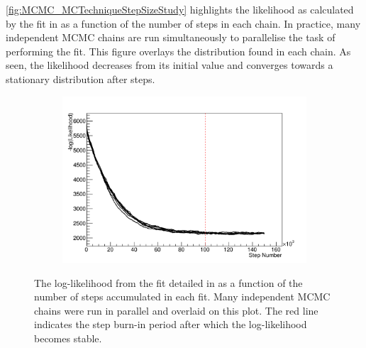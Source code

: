 \autoref{fig:MCMC_MCTechniqueStepSizeStudy} highlights the likelihood as calculated by the fit in  as a function of the number of steps in each chain. In practice, many independent MCMC chains are run simultaneously to parallelise the task of performing the fit. This figure overlays the distribution found in each chain. As seen, the likelihood decreases from its initial value and converges towards a stationary distribution after  steps. 

\begin{figure}[h]
  \begin{subfigure}[t]{0.8\textwidth}
    \includegraphics[width=\textwidth, trim={0mm 0mm 0mm 0mm}, clip,page=1]{Figures/MCMC/MCTechnique_LLHStep.pdf}
  \end{subfigure}
  \caption{The log-likelihood from the fit detailed in  as a function of the number of steps accumulated in each fit. Many independent MCMC chains were run in parallel and overlaid on this plot. The red line indicates the  step burn-in period after which the log-likelihood becomes stable.}
  \label{fig:MCMC_MCTechniqueLLHVsStep}
\end{figure}


